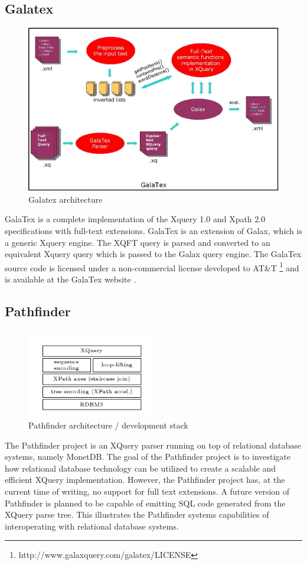 \subsection{Galatex}
\begin{figure}[!h]
  \centering
    \includegraphics[width=1\textwidth]{img/galatex_architecture.png}
  \caption{Galatex architecture}
\end{figure}
GalaTex is a complete implementation of the Xquery 1.0 and Xpath 2.0
specifications with full-text extensions. GalaTex is an extension of Galax,
which is a generic Xquery engine. The XQFT query is parsed and converted to an
equivalent Xquery query which is passed to the Galax query engine. The GalaTex
source code is licensed under a non-commercial license developed to AT\&{}T 
\footnote{http://www.galaxquery.com/galatex/LICENSE} and is available at the
GalaTex website \cite{galatex}.

\subsection{Pathfinder}
\begin{figure}[!h]
  \centering
    \includegraphics[width=0.5\textwidth]{img/pathfinder_architecture.png}
  \caption{Pathfinder architecture / development stack}
\end{figure}
The Pathfinder project is an XQuery parser running on top of relational database systems, namely MonetDB. The goal of the Pathfinder project is to investigate how relational database technology can be utilized to create a scalable and efficient XQuery implementation. However, the Pathfinder project has, at the current time of writing, no support for full text extensions. A future version of Pathfinder is planned to be capable of emitting SQL code generated from the XQuery parse tree. This illustrates the Pathfinder systems capabilities of interoperating with relational database systems.

